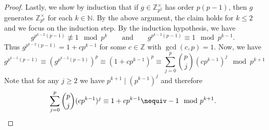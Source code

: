 \documentclass[a4paper, oneside, 12pt]{amsart}
\begin{document}
\begin{proof}
  Lastly, we show by induction that if \(g\in \mathbb{Z}_{p^{2}}^{\times}\) has order \(p(p-1)\), then \(g\) generates \( \mathbb{Z}_{p^{k}}^{\times }\) for each \(k \in \mathbb{N}\).
  By the above argument, the claim holds for \(k\leq 2\) and we focus on the induction step.
  By the induction hypothesis, we have
  \begin{equation*}
    g^{p^{k-2}(p-1)}\nequiv 1 \mod p^{k} \qquad \text{and}\qquad
    g^{p^{k-2}(p-1)}\equiv 1 \mod p^{k-1}.
  \end{equation*}
  Thus \(g^{p^{k-2}(p-1)} = 1 + cp^{k-1}\) for some \(c\in \mathbb{Z}\) with \(\gcd(c,p) = 1\).
  Now, we have
  \begin{equation*}
    g^{p^{k-1}(p-1)}
    \equiv (g^{p^{k-2}(p-1)})^{p}
    \equiv (1+ cp^{k-1})^{p}
    \equiv \sum_{j=0}^{p} \binom{p}{j}(cp^{k-1})^{j} \mod p^{k+1}
  \end{equation*}
  Note that for any \(j\geq 2\) we have \(p^{k+1} \mid (p^{k-1})^{j}\) and therefore
  \begin{equation*}
    \sum_{j=0}^{p} \binom{p}{j}(cp^{k-1})^{j}
    \equiv 1 + cp^{k-1}
    \nequiv -1 \mod p^{k+1}. \qedhere
  \end{equation*}
\end{proof}
\end{document}
